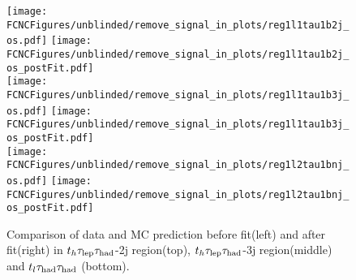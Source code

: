 \begin{figure}[H]
\centering
\texttt{[image: \\FCNCFigures/unblinded/remove\_signal\_in\_plots/reg1l1tau1b2j\_os.pdf]}
\texttt{[image: \\FCNCFigures/unblinded/remove\_signal\_in\_plots/reg1l1tau1b2j\_os\_postFit.pdf]}
\\
\texttt{[image: \\FCNCFigures/unblinded/remove\_signal\_in\_plots/reg1l1tau1b3j\_os.pdf]}
\texttt{[image: \\FCNCFigures/unblinded/remove\_signal\_in\_plots/reg1l1tau1b3j\_os\_postFit.pdf]}
\\
\texttt{[image: \\FCNCFigures/unblinded/remove\_signal\_in\_plots/reg1l2tau1bnj\_os.pdf]}
\texttt{[image: \\FCNCFigures/unblinded/remove\_signal\_in\_plots/reg1l2tau1bnj\_os\_postFit.pdf]}
\\
\caption{Comparison of data and MC prediction before fit(left) and after fit(right) in $t_h\tau_\text{lep}{}\tau_\text{had}$-2j region(top), $t_h\tau_\text{lep}{}\tau_\text{had}$-3j region(middle) and $t_l\tau_\text{had}{}\tau_\text{had}$ (bottom).}
\label{fig:tthML_remove_signal_2}
\end{figure}


\newpage
